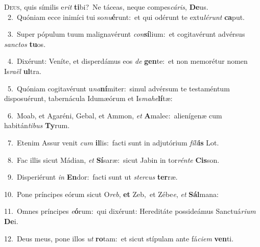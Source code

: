 \lettrine{\initial\textcolor{\initialcolor}{D}}{eus,} quis símilis e\textit{rit} \textbf{ti}\-bi?~\star Ne táceas, neque compes\-\textit{cá}\-\textit{ris}, \textbf{De}\-us.\\
{\numbfont\textcolor{\numbcolor}{~2.}}~Quóniam ecce inimíci tui so\-\textit{nu}\-\textbf{é}runt:~\star et qui odérunt te extu\-\textit{lé}\-\textit{runt} \textbf{ca}\-put.\par
{\numbfont\textcolor{\numbcolor}{~3.}}~Super pópulum tuum malignavérunt \textit{con}\-\textbf{sí}lium:~\star et cogitavérunt advérsus \textit{sanc}\-\textit{tos} \textbf{tu}\-os.\par
{\numbfont\textcolor{\numbcolor}{~4.}}~Dixérunt: Veníte, et disperdámus eos \textit{de} \textbf{gen}\-te:~\star et non memorétur nomen Is\-\textit{ra}\-\textit{ël} \textbf{ul}\-tra.\par
{\numbfont\textcolor{\numbcolor}{~5.}}~Quóniam cogitavérunt u\-\textit{na}\-\textbf{ní}miter:~\star simul advérsum te testaméntum disposuérunt, tabernácula Idumæórum et Is\-\textit{ma}\-\textit{he}\textbf{lí}tæ:\par
{\numbfont\textcolor{\numbcolor}{~6.}}~Moab, et Agaréni, Gebal, et Ammon, \textit{et} \textbf{A}\-malec:~\star alienígenæ cum habitán\-\textit{ti}\-\textit{bus} \textbf{Ty}\-rum.\par
{\numbfont\textcolor{\numbcolor}{~7.}}~Etenim Assur venit \textit{cum} \textbf{il}\-lis:~\star facti sunt in adjutórium \textit{fí}\-\textit{li}\textbf{is} Lot.\par
{\numbfont\textcolor{\numbcolor}{~8.}}~Fac illis sicut Mádian, \textit{et} \textbf{Sí}\-saræ:~\star sicut Jabin in tor\-\textit{rén}\-\textit{te} \textbf{Cis}\-son.\par
{\numbfont\textcolor{\numbcolor}{~9.}}~Disperiérunt \textit{in} \textbf{En}\-dor:~\star facti sunt ut \textit{ster}\-\textit{cus} \textbf{ter}\-ræ.\par
{\numbfont\textcolor{\numbcolor}{10.}}~Pone príncipes eórum sicut O\-\textit{reb}\-, \textbf{et} Zeb,~\star et Zébe\-\textit{e}\-, \textit{et} \textbf{Sál}\-mana:\par
{\numbfont\textcolor{\numbcolor}{11.}}~Omnes príncipes \textit{e}\-\textbf{ó}rum:~\star qui dixérunt: Hereditáte possideámus Sanctuá\-\textit{ri}\-\textit{um} \textbf{De}\-i.\par
{\numbfont\textcolor{\numbcolor}{12.}}~Deus meus, pone illos \textit{ut} \textbf{ro}\-tam:~\star et sicut stípulam ante fá\-\textit{ci}\-\textit{em} \textbf{ven}\-ti.\par
